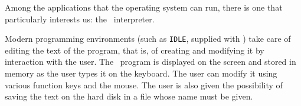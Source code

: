 {\begin{minipage}{\myparboxwidth}
Among the applications that the operating system can run,
there is one that particularly interests us: the \python\ interpreter.

Modern programming environments (such as {\tt IDLE}, supplied with \python)
take care of editing the text of the
program, that is, of creating and modifying it
by interaction with the user. The
\python\ program is displayed on the screen and stored in memory
as
the user types it on the keyboard. The user can modify it
using various function keys and the mouse. The user is also
given the possibility of saving the text on the hard disk
in a file whose name must be given.

\vspace{\abovedisplayskip}
\end{minipage}
}

